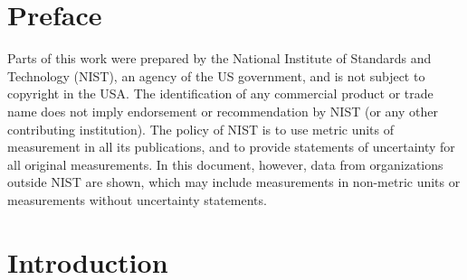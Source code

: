 \documentclass{book}
\begin{document}
\frontmatter


\chapter{Preface}

Parts of this work were prepared by the National Institute of Standards and Technology (NIST), an agency of the US government, and is not subject to copyright in the USA. The identification of any commercial product or trade name does not imply endorsement or recommendation by NIST (or any other contributing institution). The policy of NIST is to use metric units of measurement in all its publications, and to provide statements of uncertainty for all original measurements. In this document, however, data from organizations outside NIST are shown, which may include measurements in non-metric units or measurements without uncertainty statements.

\newpage

\tableofcontents

\mainmatter

\pagestyle{plain}

\chapter{Introduction}
\end{document}
